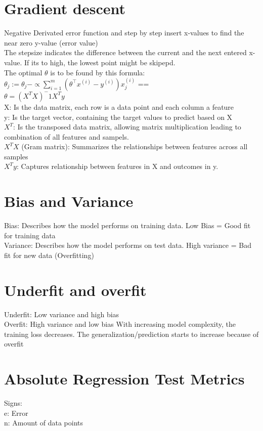 \documentclass{article}
\begin{document}
\section{Gradient descent}
Negative Derivated error function and step by step insert x-values to find the near zero y-value (error value) \\
The stepsize indicates the difference between the current and the next entered x-value. If its to high, the lowest point might be skipepd. \\
The optimal $\theta$ is to be found by this formula: \\
$\theta_j := \theta_j - \propto \sum_{i=1}^{m} \left( \theta^\top x^{(i)} - y^{(i)} \right) x_j^{(i)}$ ==\\
$\theta = (X^TX)^-1X^Ty$ \\ 
X: Is the data matrix, each row is a data point and each column a feature \\
y: Is the target vector, containing the target values to predict based on X \\
$X^T$: Is the transposed data matrix, allowing matrix multiplication leading to combination of all features and sampels.\\
$X^TX$ (Gram matrix): Summarizes the relationships between features across all samples \\
$X^Ty$: Captures relationship between features in X and outcomes in y.

\section{Bias and Variance}
Bias: Describes how the model performs on training data. Low Bias = Good fit for training data\\
Variance: Describes how the model performs on test data. High variance = Bad fit for new data (Overfitting) \\

\section{Underfit and overfit}
Underfit: Low variance and high bias \\
Overfit: High variance and low bias
With increasing model complexity, the training loss decreases. The generalization/prediction starts to increase because of overfit
\section{Absolute Regression Test Metrics}
Signs: \\
e: Error \\
n: Amount of data points\\
\end{document}

